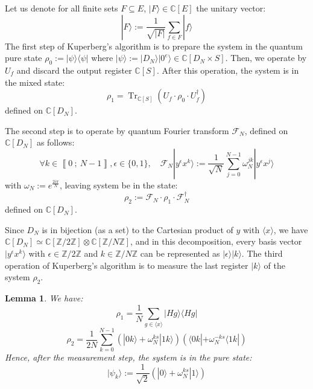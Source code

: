 \documentclass[a4paper,10pt]{report}
\theoremstyle{definition}
\theoremstyle{plain}
\newtheorem{lemma}[definition]{Lemma}
\theoremstyle{definition}
\newcommand{\Z}{\mathbb{Z}}
\newcommand{\C}{\mathbb{C}}
\newcommand{\m}[1]{\mathcal{#1}}
\renewcommand{\i}[2]{\left\llbracket #1~;~#2\right\rrbracket}
\renewcommand{\(}{\left(}
\renewcommand{\)}{\right)}
\DeclareMathOperator{\Tr}{Tr}
\begin{document}
Let us denote for all finite sets $F\subseteq E$, $|F\rangle\in\C[E]$ the unitary vector:
\[|F\rangle:=\frac{1}{\sqrt{|F|}}\sum_{f\in F}|f\rangle\]
The first step of Kuperberg's algorithm is to prepare the system in the quantum pure state $\rho_0:=|\psi\rangle\langle\psi|$ where $|\psi\rangle:=|D_N\rangle|0^e\rangle\in\C[D_N\times S]$.  Then, we operate by $U_f$ and discard the output register $\C[S]$. After this operation, the system is in the mixed state:
\[\rho_1=\Tr_{\C[S]}(U_f\cdot \rho_0\cdot U_f^{\dag})\]
defined on $\C[D_N]$.  

The second step is to operate by quantum Fourier transform $\m{F}_N$, defined on $\C[D_N]$ as follows:
\[\forall k\in\i{0}{N-1}, \epsilon\in\{0,1\}, \quad \m{F}_N|y^\epsilon x^k\rangle:=\frac{1}{\sqrt{N}}\sum_{j=0}^{N-1}\omega_N^{jk}|y^\epsilon x^j\rangle\]
with $\omega_N:=e^{\frac{2i\pi}{N}}$, leaving system be in the state:
\[\rho_2:=\m{F}_N\cdot \rho_1\cdot \m{F}_N^{\dag}\]
defined on $\C[D_N]$.

Since $D_N$ is in bijection (as a set) to the Cartesian product of $y$ with $\langle x\rangle$, we have $\C[D_N]\simeq\C[\Z/2\Z]\otimes\C[\Z/N\Z]$, and in this decomposition, every basis vector $|y^\epsilon x^k\rangle$ with $\epsilon\in\Z/2\Z$ and $k\in\Z/N\Z$ can be represented as $|\epsilon\rangle|k\rangle$. The third operation of Kuperberg's algorithm is to measure the last register $|k\rangle$ of the system $\rho_2$.

\begin{lemma}
We have:
\[\rho_1=\frac{1}{N}\sum_{g\in \langle x\rangle}|Hg\rangle\langle Hg|\]
\[\rho_2=\frac{1}{2N}\sum_{k=0}^{N-1}(|0k\rangle +\omega_N^{ks}|1k\rangle)(\langle 0k|+\omega_N^{-ks}\langle 1k|)\]
Hence, after the measurement step, the system is in the pure state:
\[|\psi_k\rangle:=\frac{1}{\sqrt{2}}(|0\rangle +\omega_N^{ks}|1\rangle)\]
\end{lemma}
\end{document}
